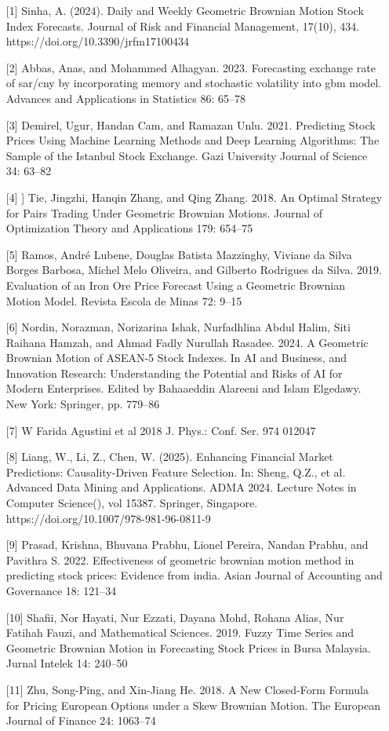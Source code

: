 \begin{talk}
\begin{enumerate}
	\item[{[1]}] Sinha, A. (2024). Daily and Weekly Geometric Brownian Motion Stock Index Forecasts. Journal of Risk and Financial Management, 17(10), 434. https://doi.org/10.3390/jrfm17100434
	\item[{[2]}] Abbas, Anas, and Mohammed Alhagyan. 2023. Forecasting exchange rate of sar/cny by incorporating memory and stochastic volatility into gbm model. Advances and Applications in Statistics 86: 65–78
    \item[{[3]}] Demirel, Ugur, Handan Cam, and Ramazan Unlu. 2021. Predicting Stock Prices Using Machine Learning Methods and Deep Learning Algorithms: The Sample of the Istanbul Stock Exchange. Gazi University Journal of Science 34: 63–82
    \item[{[4]}]] Tie, Jingzhi, Hanqin Zhang, and Qing Zhang. 2018. An Optimal Strategy for Pairs Trading Under Geometric Brownian Motions. Journal of Optimization Theory and Applications 179: 654–75
    \item[{[5]}] Ramos, André Lubene, Douglas Batista Mazzinghy, Viviane da Silva Borges Barbosa, Michel Melo Oliveira, and Gilberto Rodrigues da Silva. 2019. Evaluation of an Iron Ore Price Forecast Using a Geometric Brownian Motion Model. Revista Escola de Minas 72: 9–15
    \item[{[6]}] Nordin, Norazman, Norizarina Ishak, Nurfadhlina Abdul Halim, Siti Raihana Hamzah, and Ahmad Fadly Nurullah Rasadee. 2024. A Geometric Brownian Motion of ASEAN-5 Stock Indexes. In AI and Business, and Innovation Research: Understanding the Potential and Risks of AI for Modern Enterprises. Edited by Bahaaeddin Alareeni and Islam Elgedawy. New York: Springer, pp. 779–86
    \item[{[7]}]W Farida Agustini et al 2018 J. Phys.: Conf. Ser. 974 012047
    \item[{[8]}] Liang, W., Li, Z., Chen, W. (2025). Enhancing Financial Market Predictions: Causality-Driven Feature Selection. In: Sheng, Q.Z., et al. Advanced Data Mining and Applications. ADMA 2024. Lecture Notes in Computer Science(), vol 15387. Springer, Singapore. https://doi.org/10.1007/978-981-96-0811-9
    \item[{[9]}] Prasad, Krishna, Bhuvana Prabhu, Lionel Pereira, Nandan Prabhu, and Pavithra S. 2022. Effectiveness of geometric brownian motion method in predicting stock prices: Evidence from india. Asian Journal of Accounting and Governance 18: 121–34
    \item[{[10]}] Shafii, Nor Hayati, Nur Ezzati, Dayana Mohd, Rohana Alias, Nur Fatihah Fauzi, and Mathematical Sciences. 2019. Fuzzy Time Series and Geometric Brownian Motion in Forecasting Stock Prices in Bursa Malaysia. Jurnal Intelek 14: 240–50
    \item[{[11]}] Zhu, Song-Ping, and Xin-Jiang He. 2018. A New Closed-Form Formula for Pricing European Options under a Skew Brownian Motion. The European Journal of Finance 24: 1063–74
\end{enumerate}

\end{talk}
